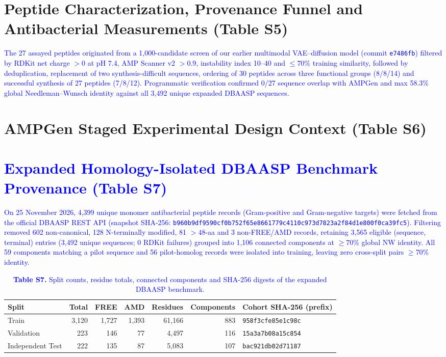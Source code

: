 \documentclass[11pt,a4paper]{article}
\newcommand{\rev}[1]{\textcolor{blue}{#1}}
\begin{document}
\section{Peptide Characterization, Provenance Funnel and Antibacterial Measurements (Table S5)}
\rev{The 27 assayed peptides originated from a 1,000-candidate screen of our earlier multimodal VAE--diffusion model (commit \texttt{e7486fb}) filtered by RDKit net charge $>0$ at pH 7.4, AMP Scanner v2 $>0.9$, instability index 10--40 and $\leq$70\% training similarity, followed by deduplication, replacement of two synthesis-difficult sequences, ordering of 30 peptides across three functional groups (8/8/14) and successful synthesis of 27 peptides (7/8/12). Programmatic verification confirmed 0/27 sequence overlap with AMPGen \cite{ref9} and max 58.3\% global Needleman--Wunsch identity against all 3,492 unique expanded DBAASP sequences.}


\section{AMPGen Staged Experimental Design Context (Table S6)}


\FloatBarrier
\section{\rev{Expanded Homology-Isolated DBAASP Benchmark Provenance (Table S7)}}
\rev{On 25 November 2026, 4,399 unique monomer antibacterial peptide records (Gram-positive and Gram-negative targets) were fetched from the official DBAASP REST API (snapshot SHA-256: \texttt{b960b9df9590cf0b752f65e8661779c4110c973d7823a2f84d1e800f0ca39fc5}). Filtering removed 602 non-canonical, 128 N-terminally modified, 81 $>48$-aa and 3 non-FREE/AMD records, retaining 3,565 eligible (sequence, terminal) entries (3,492 unique sequences; 0 RDKit failures) grouped into 1,106 connected components at $\geq$70\% global NW identity. All 59 components matching a pilot sequence and 56 pilot-homolog records were isolated into training, leaving zero cross-split pairs $\geq$70\% identity.}

\begin{table}[H]
\centering\footnotesize
\caption*{\rev{\textbf{Table S7.} Split counts, residue totals, connected components and SHA-256 digests of the expanded DBAASP benchmark.}}
\begin{tabular}{lrrrrrl}
\toprule
Split & Total & FREE & AMD & Residues & Components & Cohort SHA-256 (prefix) \\
\midrule
Train & 3,120 & 1,727 & 1,393 & 61,166 & 883 & \texttt{958f3cfe85e1c98c} \\
Validation & 223 & 146 & 77 & 4,497 & 116 & \texttt{15a3a7b08a15c854} \\
Independent Test & 222 & 135 & 87 & 5,083 & 107 & \texttt{bac921db02d71187} \\
\bottomrule
\end{tabular}
\end{table}
\end{document}
